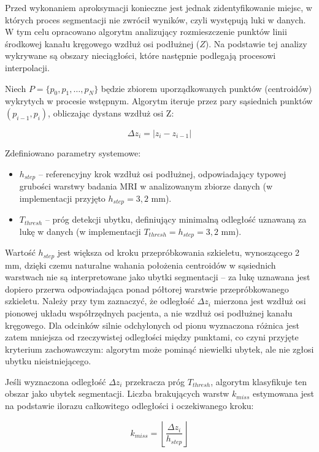 Przed wykonaniem aproksymacji konieczne jest jednak zidentyfikowanie miejsc, w których proces segmentacji nie zwrócił wyników, czyli występują luki w danych. W tym celu opracowano algorytm analizujący rozmieszczenie punktów linii środkowej kanału kręgowego wzdłuż osi podłużnej ($Z$). Na podstawie tej analizy wykrywane są obszary nieciągłości, które następnie podlegają procesowi interpolacji.

Niech $P = \{p_0, p_1, \dots, p_N\}$ będzie zbiorem uporządkowanych punktów (centroidów) wykrytych w procesie wstępnym. Algorytm iteruje przez pary sąsiednich punktów $(p_{i-1}, p_i)$, obliczając dystans wzdłuż osi Z:

\begin{equation}
    \Delta z_i = |z_i - z_{i-1}|
\end{equation}

Zdefiniowano parametry systemowe:
\begin{itemize}
    \item $h_{step}$ -- referencyjny krok wzdłuż osi podłużnej, odpowiadający typowej grubości warstwy badania MRI w analizowanym zbiorze danych (w implementacji przyjęto $h_{step} = 3{,}2$ mm).
    \item $T_{thresh}$ -- próg detekcji ubytku, definiujący minimalną odległość uznawaną za lukę w danych (w implementacji $T_{thresh} = h_{step} = 3{,}2$ mm).
\end{itemize}

Wartość $h_{step}$ jest większa od kroku przepróbkowania szkieletu, wynoszącego 2 mm, dzięki czemu naturalne wahania położenia centroidów w sąsiednich warstwach nie są interpretowane jako ubytki segmentacji -- za lukę uznawana jest dopiero przerwa odpowiadająca ponad półtorej warstwie przepróbkowanego szkieletu.
Należy przy tym zaznaczyć, że odległość $\Delta z_i$ mierzona jest wzdłuż osi pionowej układu współrzędnych pacjenta, a nie wzdłuż osi podłużnej kanału kręgowego.
Dla odcinków silnie odchylonych od pionu wyznaczona różnica jest zatem mniejsza od rzeczywistej odległości między punktami, co czyni przyjęte kryterium zachowawczym: algorytm może pominąć niewielki ubytek, ale nie zgłosi ubytku nieistniejącego.

Jeśli wyznaczona odległość $\Delta z_i$ przekracza próg $T_{thresh}$, algorytm klasyfikuje ten obszar jako ubytek segmentacji.
Liczba brakujących warstw $k_{miss}$ estymowana jest na podstawie ilorazu całkowitego odległości i oczekiwanego kroku:

\begin{equation}
    k_{miss} = \left\lfloor \frac{\Delta z_i}{h_{step}} \right\rfloor
\end{equation}

